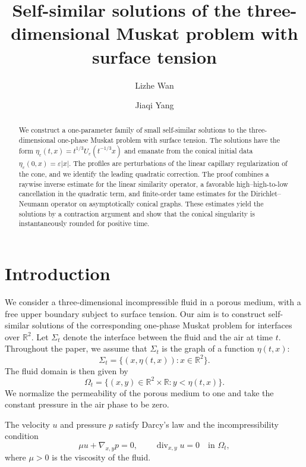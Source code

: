 \documentclass[12pt]{amsart}
\author{Lizhe Wan}
\author{Jiaqi Yang}
\theoremstyle{remark}
\theoremstyle{definition}
\numberwithin{equation}{section}
\newcommand{\R}{\mathbb{R}}
\begin{document}
\title{Self-similar solutions of the three-dimensional Muskat problem with surface tension}

\begin{abstract}
We construct a one-parameter family of small self-similar solutions
to the three-dimensional one-phase Muskat problem with surface
tension. The solutions have the form
\(\eta_\varepsilon(t,x)
=t^{1/3}U_\varepsilon(t^{-1/3}x)\)
and emanate from the conical initial data
\(\eta_\varepsilon(0,x)=\varepsilon|x|\).
The profiles are perturbations of the linear capillary regularization of
the cone, and we identify the leading quadratic correction. The proof
combines a raywise inverse estimate for the linear
similarity operator, a favorable high--high-to-low cancellation in
the quadratic term, and finite-order tame estimates for the
Dirichlet--Neumann operator on asymptotically conical graphs.
These estimates yield the solutions by a contraction argument and
show that the conical singularity is instantaneously rounded for
positive time.
\end{abstract}

\maketitle

\section{Introduction}
We consider a three-dimensional incompressible fluid in a porous medium,
with a free upper boundary subject to surface tension. Our aim is to
construct self-similar solutions of the corresponding one-phase Muskat
problem for interfaces over \(\R^2\).
Let \(\Sigma_t\) denote the interface between the fluid and the air at time \(t\).
Throughout the paper, we assume that \(\Sigma_t\) is the graph of a function \(\eta(t,x)\):
\begin{equation*}
 \Sigma_t=\{(x,\eta(t,x)):x\in\R^2\}.
\end{equation*}
The fluid domain is then given by
\begin{equation*}
 \Omega_t=\{(x,y)\in\R^2\times\R:y<\eta(t,x)\}.
\end{equation*}
We normalize the permeability of the porous medium to one and take the constant pressure in the air phase to be zero.

The velocity \(u\) and pressure \(p\) satisfy Darcy's law and the incompressibility condition
\begin{equation*}
 \mu u+\nabla_{x,y}p=0, \qquad \operatorname{div}_{x,y}u=0 \quad\text{in }\Omega_t,
\end{equation*}
where \(\mu>0\) is the viscosity of the fluid.
\end{document}
